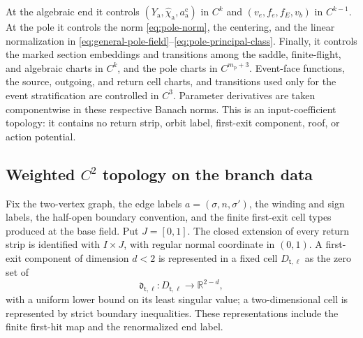 \documentclass[11pt]{amsart}
\numberwithin{equation}{section}
\theoremstyle{definition}
\theoremstyle{remark}
\newcommand{\R}{\mathbb R}
\begin{document}
At the algebraic end it controls
$(Y_{\mathrm a},\widehat\chi_{\mathrm a},a_{\mathrm a}^{\mathrm c})$ in
$C^k$ and $(v_e,f_e,f_E,v_b)$ in $C^{k-1}$.  At the pole it controls the
norm \eqref{eq:pole-norm}, the centering, and the linear normalization in
\eqref{eq:general-pole-field}--\eqref{eq:pole-principal-class}.  Finally,
it controls the marked section embeddings and transitions among the
saddle, finite-flight, and algebraic charts in $C^k$, and the pole charts
in $C^{m_{\mathrm p}+3}$.  Event-face functions, the source, outgoing, and
return cell charts, and transitions used only for the event
stratification are controlled in $C^3$.  Parameter derivatives are taken
componentwise in these respective Banach norms.  This is an
input-coefficient topology: it contains no return strip, orbit label,
first-exit component, roof, or action potential.

\subsection{Weighted \texorpdfstring{$C^2$}{C2} topology on the branch data}

Fix the two-vertex graph, the edge labels
$a=(\sigma,n,\sigma')$, the winding and sign labels, the half-open boundary
convention, and the finite first-exit cell types produced at the base field.
Put $J=[0,1]$.  The closed extension of every return strip is identified with
$I\times J$, with regular normal coordinate in $(0,1)$.  A first-exit component of
dimension $d<2$ is represented in a fixed cell $D_{\mathsf t,\ell}$ as the zero set of
\[
 \mathfrak d_{\mathsf t,\ell}:D_{\mathsf t,\ell}\longrightarrow\R^{2-d},
\]
with a uniform lower bound on its least singular value; a two-dimensional
cell is represented by strict boundary inequalities.  These
representations include the finite first-hit map and the renormalized end
label.
\end{document}
